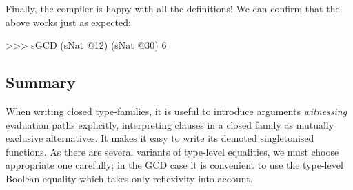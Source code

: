 \documentclass[demotion-paper.tex]{subfiles}
\begin{document}
Finally, the compiler is happy with all the definitions!
We can confirm that the above  works just as expected:
\begin{repl}
>>> sGCD (sNat @12) (sNat @30)
6
\end{repl}

\subsection{Summary}
When writing closed type-families, it is useful to introduce arguments \emph{witnessing} evaluation paths explicitly, interpreting clauses in a closed family as mutually exclusive alternatives.
It makes it easy to write its demoted singletonised functions.
As there are several variants of type-level equalities, we must choose appropriate one carefully; in the GCD case it is convenient to use the type-level Boolean equality which takes only reflexivity into account.
\end{document}
